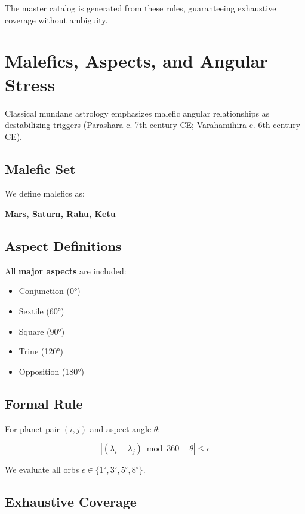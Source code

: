 \documentclass[
  11pt,
  a4paper,
  oneside,
  openany]{article}
\providecommand{\tightlist}{%
  \setlength{\itemsep}{0pt}\setlength{\parskip}{0pt}}\usepackage{longtable,booktabs,array}
\begin{document}
The master catalog is generated from these rules, guaranteeing
exhaustive coverage without ambiguity.

\section{Malefics, Aspects, and Angular
Stress}\label{malefics-aspects-and-angular-stress}

Classical mundane astrology emphasizes malefic angular relationships as
destabilizing triggers (Parashara c. 7th century CE; Varahamihira c. 6th
century CE).

\subsection{Malefic Set}\label{malefic-set}

We define malefics as:

\textbf{Mars, Saturn, Rahu, Ketu}

\subsection{Aspect Definitions}\label{aspect-definitions}

All \textbf{major aspects} are included:

\begin{itemize}
\tightlist
\item
  Conjunction (0°)
\item
  Sextile (60°)
\item
  Square (90°)
\item
  Trine (120°)
\item
  Opposition (180°)
\end{itemize}

\subsection{Formal Rule}\label{formal-rule}

For planet pair \((i,j)\) and aspect angle \(\theta\):

\[
|(\lambda_i - \lambda_j) \bmod 360 - \theta| \leq \epsilon
\]

We evaluate all orbs
\(\epsilon \in \{1^\circ, 3^\circ, 5^\circ, 8^\circ\}\).

\subsection{Exhaustive Coverage}\label{exhaustive-coverage}
\end{document}
